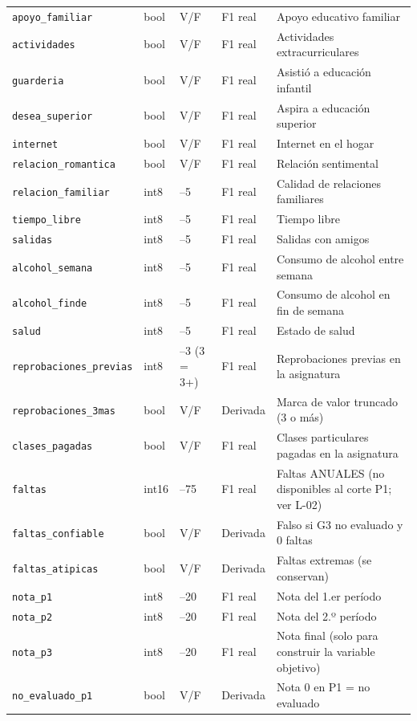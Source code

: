 {\begin{longtable}{>{\raggedright\arraybackslash}p{3.9cm}p{1.2cm}>{\raggedright\arraybackslash}p{2.0cm}>{\raggedright\arraybackslash}p{2.3cm}>{\raggedright\arraybackslash}p{4.8cm}}
\texttt{apoyo\_familiar} & bool & V/F & F1 real & Apoyo educativo familiar \\
\texttt{actividades} & bool & V/F & F1 real & Actividades extracurriculares \\
\texttt{guarderia} & bool & V/F & F1 real & Asistió a educación infantil \\
\texttt{desea\_superior} & bool & V/F & F1 real & Aspira a educación superior \\
\texttt{internet} & bool & V/F & F1 real & Internet en el hogar \\
\texttt{relacion\_romantica} & bool & V/F & F1 real & Relación sentimental \\
\texttt{relacion\_familiar} & int8 & 1–5 & F1 real & Calidad de relaciones familiares \\
\texttt{tiempo\_libre} & int8 & 1–5 & F1 real & Tiempo libre \\
\texttt{salidas} & int8 & 1–5 & F1 real & Salidas con amigos \\
\texttt{alcohol\_semana} & int8 & 1–5 & F1 real & Consumo de alcohol entre semana \\
\texttt{alcohol\_finde} & int8 & 1–5 & F1 real & Consumo de alcohol en fin de semana \\
\texttt{salud} & int8 & 1–5 & F1 real & Estado de salud \\
\texttt{reprobaciones\_previas} & int8 & 0–3 (3 = 3+) & F1 real & Reprobaciones previas en la asignatura \\
\texttt{reprobaciones\_3mas} & bool & V/F & Derivada & Marca de valor truncado (3 o más) \\
\texttt{clases\_pagadas} & bool & V/F & F1 real & Clases particulares pagadas en la asignatura \\
\texttt{faltas} & int16 & 0–75 & F1 real & Faltas ANUALES (no disponibles al corte P1; ver L-02) \\
\texttt{faltas\_confiable} & bool & V/F & Derivada & Falso si G3 no evaluado y 0 faltas \\
\texttt{faltas\_atipicas} & bool & V/F & Derivada & Faltas extremas (se conservan) \\
\texttt{nota\_p1} & int8 & 0–20 & F1 real & Nota del 1.er período \\
\texttt{nota\_p2} & int8 & 0–20 & F1 real & Nota del 2.º período \\
\texttt{nota\_p3} & int8 & 0–20 & F1 real & Nota final (solo para construir la variable objetivo) \\
\texttt{no\_evaluado\_p1} & bool & V/F & Derivada & Nota 0 en P1 = no evaluado \\

\end{longtable}}
